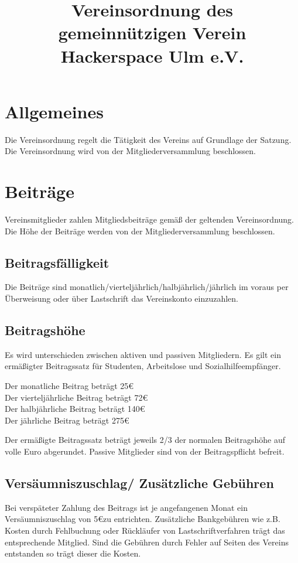 \documentclass[a4paper, 12pt]{scrartcl}
\title{Vereinsordnung des gemeinnützigen Verein Hackerspace Ulm e.V. }
\author{}
\date{}
\begin{document}
\maketitle
\sffamily

\section{Allgemeines}
Die Vereinsordnung regelt die Tätigkeit des Vereins auf Grundlage der Satzung. Die Vereinsordnung wird von der Mitgliederversammlung beschlossen. 
\section{Beiträge}
Vereinsmitglieder zahlen Mitgliedsbeiträge gemäß der geltenden Vereinsordnung. Die Höhe der Beiträge werden von der Mitgliederversammlung beschlossen. 
\subsection{Beitragsfälligkeit}
Die Beiträge sind monatlich/vierteljährlich/halbjährlich/jährlich im voraus per Überweisung oder über Lastschrift das Vereinskonto einzuzahlen. 
\subsection{Beitragshöhe}
Es wird unterschieden zwischen aktiven und passiven Mitgliedern. Es gilt ein ermäßigter Beitragssatz für Studenten, Arbeitslose und Sozialhilfeempfänger. 
\begin{addmargin}[0.25in]{0cm}
Der monatliche Beitrag beträgt 25\euro{}\\
Der vierteljährliche Beitrag beträgt 72\euro{}\\
Der halbjährliche Beitrag beträgt 140\euro{} \\
Der jährliche Beitrag beträgt 275\euro{}
\end{addmargin}
Der ermäßigte Beitragssatz beträgt jeweils 2/3 der normalen Beitragshöhe auf volle Euro abgerundet. Passive Mitglieder sind von der Beitragspflicht befreit. 
\subsection{Versäumniszuschlag/ Zusätzliche Gebühren}
Bei verspäteter Zahlung des Beitrags ist je angefangenen Monat ein Versäumniszuschlag von 5\euro zu entrichten. Zusätzliche Bankgebühren wie z.B. Kosten durch Fehlbuchung oder Rückläufer von Lastschriftverfahren trägt das entsprechende Mitglied. Sind die Gebühren durch Fehler auf Seiten des Vereins entstanden so trägt dieser die Kosten. 
\end{document}
